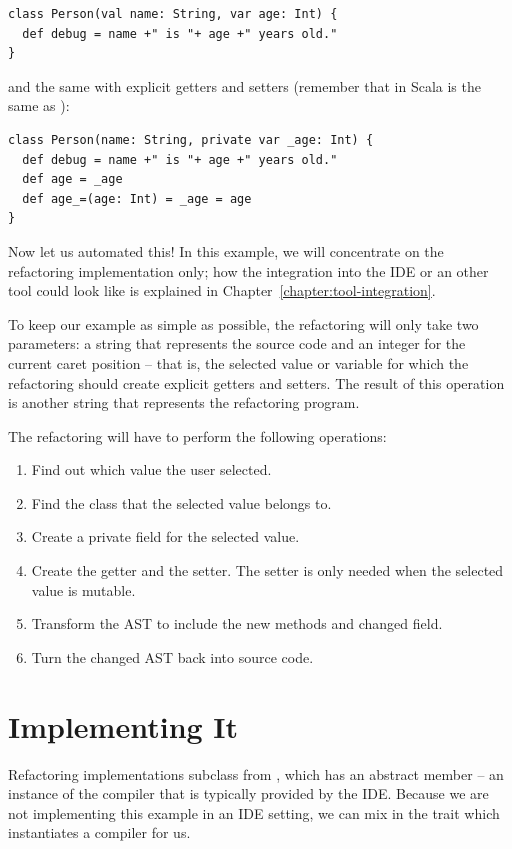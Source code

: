 \documentclass[10pt,a4paper,oneside]{scrreprt}
\begin{document}
\begin{lstlisting}
class Person(val name: String, var age: Int) {
  def debug = name +" is "+ age +" years old."
}
\end{lstlisting}

and the same with explicit getters and setters (remember that in Scala  is the same as ):

\begin{lstlisting}
class Person(name: String, private var _age: Int) {
  def debug = name +" is "+ age +" years old."
  def age = _age
  def age_=(age: Int) = _age = age
}
\end{lstlisting}

Now let us automated this! In this example, we will concentrate on the refactoring implementation only; how the integration into the IDE or an other tool could look like is explained in Chapter~\vref{chapter:tool-integration}.

To keep our example as simple as possible, the refactoring will only take two parameters: a string that represents the source code and an integer for the current caret position -- that is, the selected value or variable for which the refactoring should create explicit getters and setters. The result of this operation is another string that represents the refactoring program. 

The refactoring will have to perform the following operations:

\begin{enumerate}
  \item Find out which value the user selected.
  \item Find the class that the selected value belongs to.
  \item Create a private field for the selected value.
  \item Create the getter and the setter. The setter is only needed when the selected value is mutable.
  \item Transform the AST to include the new methods and changed field.
  \item Turn the changed AST back into source code.
\end{enumerate}

\section{Implementing It}

Refactoring implementations subclass from , which has an abstract member  -- an instance of the compiler that is typically provided by the IDE. Because we are not implementing this example in an IDE setting, we can mix in the  trait which instantiates a compiler for us.
\end{document}
